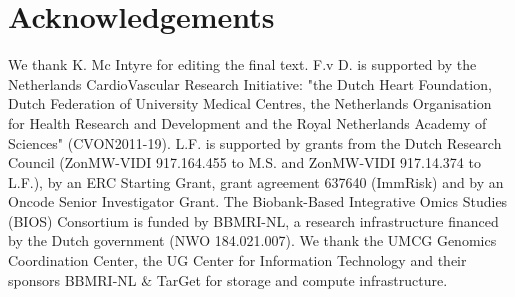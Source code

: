 \section*{Acknowledgements}
We thank K. Mc Intyre for editing the final text. F.v D. is supported by the Netherlands CardioVascular Research Initiative: "the Dutch Heart Foundation, Dutch Federation of University Medical Centres, the Netherlands Organisation for Health Research and Development and the Royal Netherlands Academy of Sciences" (CVON2011-19). L.F. is supported by grants from the Dutch Research Council (ZonMW-VIDI 917.164.455 to M.S. and ZonMW-VIDI 917.14.374 to L.F.), by an ERC Starting Grant, grant agreement 637640 (ImmRisk) and by an Oncode Senior Investigator Grant. The Biobank-Based Integrative Omics Studies (BIOS) Consortium is funded by BBMRI-NL, a research infrastructure financed by the Dutch government (NWO 184.021.007). We thank the UMCG Genomics Coordination Center, the UG Center for Information Technology and their sponsors BBMRI-NL \& TarGet for storage and compute infrastructure.





\leftwatermark{}
\rightwatermark{}
